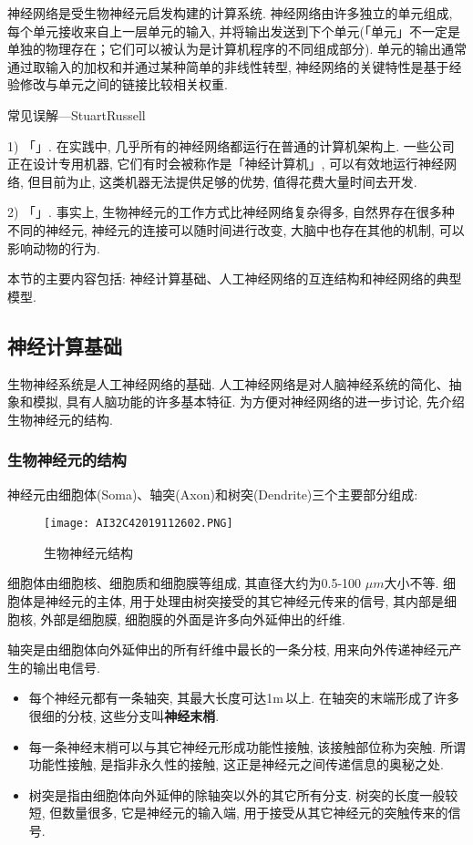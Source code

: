 神经网络是受生物神经元启发构建的计算系统. 神经网络由许多独立的单元组成, 每个单元接收来自上一层单元的输入, 并将输出发送到下个单元(「单元」不一定是单独的物理存在；它们可以被认为是计算机程序的不同组成部分). 单元的输出通常通过取输入的加权和并通过某种简单的非线性转型, 神经网络的关键特性是基于经验修改与单元之间的链接比较相关权重.

\textcolor[rgb]{0,0,1}{常见误解---StuartRussell}

1) 「」. 在实践中, 几乎所有的神经网络都运行在普通的计算机架构上. 一些公司正在设计专用机器, 它们有时会被称作是「神经计算机」, 可以有效地运行神经网络, 但目前为止, 这类机器无法提供足够的优势, 值得花费大量时间去开发.

2) 「」. 事实上, 生物神经元的工作方式比神经网络复杂得多, 自然界存在很多种不同的神经元, 神经元的连接可以随时间进行改变, 大脑中也存在其他的机制, 可以影响动物的行为.

本节的主要内容包括: 神经计算基础、人工神经网络的互连结构和神经网络的典型模型.
\subsection{神经计算基础}
生物神经系统是人工神经网络的基础. 人工神经网络是对人脑神经系统的简化、抽象和模拟, 具有人脑功能的许多基本特征.
为方便对神经网络的进一步讨论, 先介绍生物神经元的结构.
\subsubsection{生物神经元的结构}
神经元由细胞体(Soma)、轴突(Axon)和树突(Dendrite)三个主要部分组成:
\begin{figure}[H]
\centering
\texttt{[image: AI32C42019112602.PNG]}
\caption{生物神经元结构}
\label{AI32fig2602}
\end{figure}
细胞体由细胞核、细胞质和细胞膜等组成, 其直径大约为0.5-100 $\si{\mu m}$大小不等. 细胞体是神经元的主体, 用于处理由树突接受的其它神经元传来的信号, 其内部是细胞核, 外部是细胞膜, 细胞膜的外面是许多向外延伸出的纤维.

轴突是由细胞体向外延伸出的所有纤维中最长的一条分枝, 用来向外传递神经元产生的输出电信号.
\begin{itemize}
\item 每个神经元都有一条轴突, 其最大长度可达1\si{m}\,以上. 在轴突的末端形成了许多很细的分枝, 这些分支叫\textbf{神经末梢}.
\item 每一条神经末梢可以与其它神经元形成功能性接触, 该接触部位称为突触. 所谓功能性接触, 是指非永久性的接触, 这正是神经元之间传递信息的奥秘之处.
\item 树突是指由细胞体向外延伸的除轴突以外的其它所有分支. 树突的长度一般较短, 但数量很多, 它是神经元的输入端, 用于接受从其它神经元的突触传来的信号.
\end{itemize}
